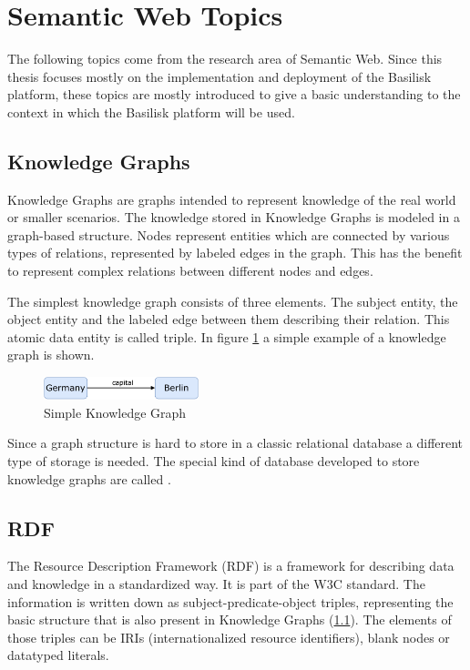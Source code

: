 \section{Semantic Web Topics}
\label{sec:sw_topics}
The following topics come from the research area of Semantic Web.
Since this thesis focuses mostly on the implementation and deployment of the Basilisk platform, these topics are mostly introduced to give a basic understanding to the context in which the Basilisk platform will be used.

\subsection{Knowledge Graphs} 
\label{sec:knowledge_graphs}
Knowledge Graphs are graphs intended to represent knowledge of the real world or smaller scenarios.
The knowledge stored in Knowledge Graphs is modeled in a graph-based structure. 
Nodes represent entities which are connected by various types of relations, represented by labeled edges in the graph.
This has the benefit to represent complex relations between different nodes and edges\cite{hoganKnowledgeGraphs2021}.

The simplest knowledge graph consists of three elements.
The subject entity, the object entity and the labeled edge between them describing their relation.
This atomic data entity is called triple.
In figure \ref{fig:example-knowledge-graph} a simple example of a knowledge graph is shown.

\begin{figure}[tbph]
	\centering
	\includegraphics[width=0.4\textwidth]{figures/knowledge-graph-diagram}
	\caption{Simple Knowledge Graph}
	\label{fig:example-knowledge-graph}
\end{figure}

Since a graph structure is hard to store in a classic relational database a different type of storage is needed.
The special kind of database developed to store knowledge graphs are called \tsp{}.


\subsection{RDF}
\label{sec:rdf}
The Resource Description Framework (RDF) is a framework for describing data and knowledge in a standardized way\cite{RDFConceptsAbstract}. 
It is part of the W3C standard.
The information is written down as subject-predicate-object triples, representing the basic structure that is also present in Knowledge Graphs (\ref{sec:knowledge_graphs}).
The elements of those triples can be IRIs (internationalized resource identifiers), blank nodes or datatyped literals.

